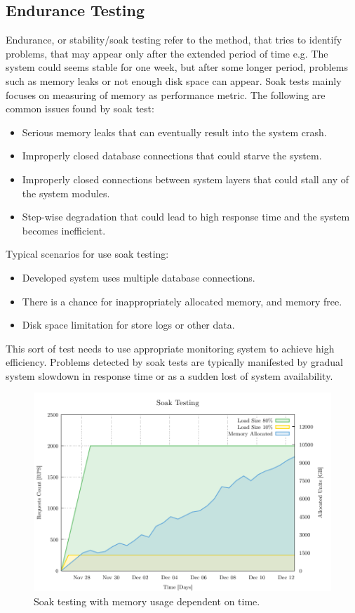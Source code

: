 \subsection*{Endurance Testing}
\label{Endurance Testing}
Endurance, or stability/soak testing refer to the method, that tries to identify problems, that may appear only after the extended period of time e.g. The system could seems stable for one week, but after some longer period, problems such as memory leaks or not enough disk space can appear. Soak tests mainly focuses on measuring of memory as performance metric. The following are common issues found by soak test:
\begin{itemize}
	\setlength\itemsep{0em}
	\item Serious memory leaks that can eventually result into the system crash.
	\item Improperly closed database connections that could starve the system.
	\item Improperly closed connections between system layers that could stall any of the system modules.
	\item Step-wise degradation that could lead to high response time and the system becomes inefficient.
\end{itemize}
Typical scenarios for use soak testing:
\begin{itemize}
	\setlength\itemsep{0em}
	\item Developed system uses multiple database connections.
	\item There is a chance for inappropriately allocated memory, and memory free.
	\item Disk space limitation for store logs or other data.
\end{itemize}


This sort of test needs to use appropriate monitoring system to achieve high efficiency. Problems detected by soak tests are typically manifested by gradual system slowdown in response time or as a sudden lost of system availability.

\begin{figure}[H]
  \centering
  \includegraphics[width=15cm]{obrazky-figures/soak_testing.pdf}
  \caption{Soak testing with memory usage dependent on time.}
  \label{fig:soak_test}
\end{figure}

